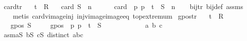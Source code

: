 \begin{isabellebody}
\ card{\isacharunderscore}{\kern0pt}tr{\isacharcolon}{\kern0pt}\isanewline
\ \ \ t\ {\isacharcolon}{\kern0pt}{\isacharcolon}{\kern0pt}\ R{}\isanewline
\ \ \ {\isachardoublequoteopen}card\ S\ {\isacharequal}{\kern0pt}\ n{\isachardoublequoteclose}\ \isanewline
\ \ \ \ \ {\isachardoublequoteopen}card\ {\isacharparenleft}{\kern0pt}{\isacharparenleft}{\kern0pt}{\isasymlambda}\ p{\isachardot}{\kern0pt}\ p\ {\isacharplus}{\kern0pt}\ t{\isacharparenright}{\kern0pt}\ {\isacharbackquote}{\kern0pt}\ S{\isacharparenright}{\kern0pt}\ {\isacharequal}{\kern0pt}\ n{\isachardoublequoteclose}\isanewline
%
\isadelimproof
\ \ %
\endisadelimproof
%
\isatagproof
{}\isamarkupfalse%
\ bij{\isacharunderscore}{\kern0pt}tr\ bij{\isacharunderscore}{\kern0pt}def\ assms\isanewline
\ \ \isamarkupfalse%
\ {\isacharparenleft}{\kern0pt}metis\ card{\isacharunderscore}{\kern0pt}vimage{\isacharunderscore}{\kern0pt}inj\ inj{\isacharunderscore}{\kern0pt}vimage{\isacharunderscore}{\kern0pt}image{\isacharunderscore}{\kern0pt}eq\ top{\isachardot}{\kern0pt}extremum{\isacharparenright}{\kern0pt}%
\endisatagproof
{\isafoldproof}%
%
\isadelimproof
\isanewline
%
\endisadelimproof
\isanewline
{}\isamarkupfalse%
\ gpos{\isacharunderscore}{\kern0pt}tr{\isacharcolon}{\kern0pt}\isanewline
\ \ \ t\ {\isacharcolon}{\kern0pt}{\isacharcolon}{\kern0pt}\ R{}\isanewline
\ \ \ {\isachardoublequoteopen}gpos\ S{\isachardoublequoteclose}\isanewline
\ \ \ \ \ {\isachardoublequoteopen}gpos\ {\isacharparenleft}{\kern0pt}{\isacharparenleft}{\kern0pt}{\isasymlambda}\ p{\isachardot}{\kern0pt}\ p\ {\isacharplus}{\kern0pt}\ t{\isacharparenright}{\kern0pt}\ {\isacharbackquote}{\kern0pt}\ S{\isacharparenright}{\kern0pt}{\isachardoublequoteclose}\isanewline
%
\isadelimproof
%
\endisadelimproof
%
\isatagproof
{}\isamarkupfalse%
{\isacharminus}{\kern0pt}\isanewline
\ \ \ \ \isakeywordONE{{\isacharbraceleft}{\kern0pt}}\isamarkupfalse%
\isanewline
\ \ \ \ \ \ \isamarkupfalse%
\ a\ b\ c\isanewline
\ \ \ \ \ \ \isamarkupfalse%
\ asm{\isacharcolon}{\kern0pt}{\isachardoublequoteopen}a{\isasymin}S{\isachardoublequoteclose}\ {\isachardoublequoteopen}b{\isasymin}S{\isachardoublequoteclose}\ {\isachardoublequoteopen}c{\isasymin}S{\isachardoublequoteclose}\ {\isachardoublequoteopen}distinct\ {\isacharbrackleft}{\kern0pt}a{\isacharcomma}{\kern0pt}b{\isacharcomma}{\kern0pt}c{\isacharbrackright}{\kern0pt}{\isachardoublequoteclose}\isanewline

\end{isabellebody}
